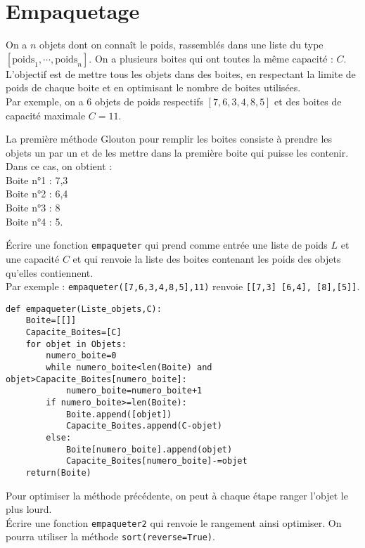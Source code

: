 \section{Empaquetage}
On a $n$ objets dont on connaît le poids, rassemblés dans une liste du type $[\text{poids}_1,\cdots,\text{poids}_n]$.
On a plusieurs boites qui ont toutes la même capacité : $C$.
L'objectif est de mettre tous les objets dans des boites, en respectant la limite de poids de chaque boite et en optimisant le nombre de boites utilisées.\\
Par exemple, on a 6 objets de poids respectifs $[7,6,3,4,8,5]$ et des boites de capacité maximale $C=11$.

La première méthode Glouton pour remplir les boites consiste à prendre les objets un par un et de les mettre dans la première boite qui puisse les contenir. Dans ce cas, on obtient : \\
Boite n°1 : 7,3 \\
Boite n°2 :  6,4\\
Boite n°3 : 8\\
Boite n°4 : 5.\\



\begin{exercice}
Écrire une fonction \verb?empaqueter? qui prend comme entrée une liste de poids $L$ et une capacité $C$ et qui renvoie la liste des boites contenant les poids des objets qu'elles contiennent. \\
Par exemple : \verb?empaqueter([7,6,3,4,8,5],11)? renvoie \verb?[[7,3] [6,4], [8],[5]]?.
\end{exercice}

\begin{solution}
\begin{verbatim}
def empaqueter(Liste_objets,C):
    Boite=[[]]
    Capacite_Boites=[C]
    for objet in Objets:
        numero_boite=0
        while numero_boite<len(Boite) and objet>Capacite_Boites[numero_boite]:
            numero_boite=numero_boite+1
        if numero_boite>=len(Boite):
            Boite.append([objet])
            Capacite_Boites.append(C-objet)
        else:
            Boite[numero_boite].append(objet)
            Capacite_Boites[numero_boite]-=objet
    return(Boite) 
\end{verbatim}
\end{solution}



\begin{exercice}
Pour optimiser la méthode précédente, on peut à chaque étape ranger l'objet le plus lourd. \\
Écrire une fonction \verb?empaqueter2? qui renvoie le rangement ainsi optimiser. On pourra utiliser la méthode \verb?sort(reverse=True)?.
\end{exercice}

